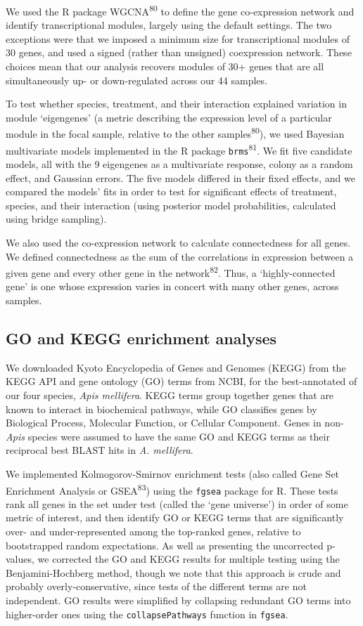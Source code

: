 \documentclass[12pt,]{article}
\begin{document}
We used the R package WGCNA\textsuperscript{80} to define the gene
co-expression network and identify transcriptional modules, largely
using the default settings. The two exceptions were that we imposed a
minimum size for transcriptional modules of 30 genes, and used a signed
(rather than unsigned) coexpression network. These choices mean that our
analysis recovers modules of 30+ genes that are all simultaneously up-
or down-regulated across our 44 samples.

To test whether species, treatment, and their interaction explained
variation in module `eigengenes' (a metric describing the expression
level of a particular module in the focal sample, relative to the other
samples\textsuperscript{80}), we used Bayesian multivariate models
implemented in the R package \texttt{brms}\textsuperscript{81}. We fit
five candidate models, all with the 9 eigengenes as a multivariate
response, colony as a random effect, and Gaussian errors. The five
models differed in their fixed effects, and we compared the models' fits
in order to test for significant effects of treatment, species, and
their interaction (using posterior model probabilities, calculated using
bridge sampling).

We also used the co-expression network to calculate connectedness for
all genes. We defined connectedness as the sum of the correlations in
expression between a given gene and every other gene in the
network\textsuperscript{82}. Thus, a `highly-connected gene' is one
whose expression varies in concert with many other genes, across
samples.

\subsection{GO and KEGG enrichment
analyses}\label{go-and-kegg-enrichment-analyses}

We downloaded Kyoto Encyclopedia of Genes and Genomes (KEGG) from the
KEGG API and gene ontology (GO) terms from NCBI, for the best-annotated
of our four species, \emph{Apis mellifera}. KEGG terms group together
genes that are known to interact in biochemical pathways, while GO
classifies genes by Biological Process, Molecular Function, or Cellular
Component. Genes in non-\emph{Apis} species were assumed to have the
same GO and KEGG terms as their reciprocal best BLAST hits in \emph{A.
mellifera}.

We implemented Kolmogorov-Smirnov enrichment tests (also called Gene Set
Enrichment Analysis or GSEA\textsuperscript{83}) using the
\texttt{fgsea} package for R. These tests rank all genes in the set
under test (called the `gene universe') in order of some metric of
interest, and then identify GO or KEGG terms that are significantly
over- and under-represented among the top-ranked genes, relative to
bootstrapped random expectations. As well as presenting the uncorrected
p-values, we corrected the GO and KEGG results for multiple testing
using the Benjamini-Hochberg method, though we note that this approach
is crude and probably overly-conservative, since tests of the different
terms are not independent. GO results were simplified by collapsing
redundant GO terms into higher-order ones using the
\texttt{collapsePathways} function in \texttt{fgsea}.
\end{document}
